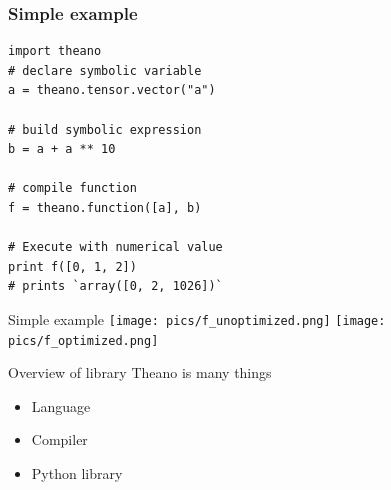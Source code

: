 \documentclass[utf8x,xcolor=pdftex,dvipsnames,table]{beamer}
\begin{document}



\begin{frame}[fragile]
  \frametitle{Simple example}

\begin{lstlisting}
import theano
# declare symbolic variable
a = theano.tensor.vector("a")

# build symbolic expression
b = a + a ** 10

# compile function
f = theano.function([a], b)

# Execute with numerical value
print f([0, 1, 2])
# prints `array([0, 2, 1026])`
\end{lstlisting}
\end{frame}

\begin{frame}{Simple example}
\center
\texttt{[image: pics/f\_unoptimized.png]}
\hspace{0.1\textwidth}
\texttt{[image: pics/f\_optimized.png]}
\end{frame}


\begin{frame}{Overview of library}
  Theano is many things
  \begin{itemize}
  \item Language
  \item Compiler
  \item Python library
  \end{itemize}
\end{frame}
\end{document}
